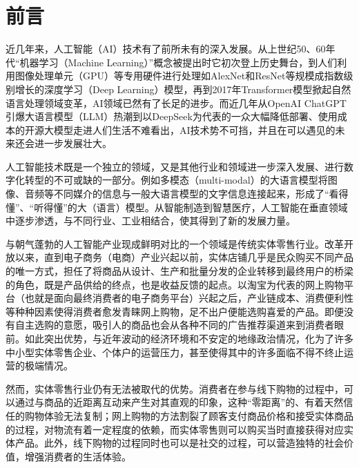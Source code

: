 \section{前\hspace{1em}言}

近几年来，人工智能（AI）技术有了前所未有的深入发展。从上世纪50、60年代“机器学习（Machine Learning）”\cite{samuel1959machine_learning}概念被提出时它初次登上历史舞台，到人们利用图像处理单元（GPU）等专用硬件进行处理\cite{raina2009deep_unsupervised_learning}如AlexNet\cite{krizhevsky2017alexnet}和ResNet\cite{he2016resnet}等规模成指数级别增长的深度学习（Deep Learning）模型，再到2017年Transformer模型\cite{vaswani2023attention_is_all_you_need}掀起自然语言处理领域变革，AI领域已然有了长足的进步。而近几年从OpenAI ChatGPT\cite{openai2022chatgpt}引爆大语言模型（LLM）热潮到以DeepSeek为代表的一众大幅降低部署、使用成本的开源大模型走进人们生活不难看出，AI技术势不可挡，并且在可以遇见的未来还会进一步发展壮大。

人工智能技术既是一个独立的领域，又是其他行业和领域进一步深入发展\cite{su2025ai_plus_concrete_economics}、进行数字化转型\cite{xie2025ai_plus_digitization}的不可或缺的一部分。例如多模态（multi-modal）的大语言模型将图像、音频等不同媒介的信息与一般大语言模型的文字信息连接起来，形成了“看得懂”、“听得懂”的大（语言）模型\cite{radford2022multimodal_speech}。从智能制造到智慧医疗，人工智能在垂直领域中逐步渗透，与不同行业、工业相结合，使其得到了新的发展力量。

与朝气蓬勃的人工智能产业现成鲜明对比的一个领域是传统实体零售行业。改革开放以来，直到电子商务（电商）产业兴起以前，实体店铺几乎是民众购买不同产品的唯一方式，担任了将商品从设计、生产和批量分发的企业转移到最终用户的桥梁的角色，既是产品供给的终点，也是收益反馈的起点。以淘宝为代表的网上购物平台（也就是面向最终消费者的电子商务平台）兴起之后，产业链成本、消费便利性等种种因素使得消费者愈发青睐网上购物\cite{wu2001online-consumer-analysis}，足不出户便能选购喜爱的产品\cite{cha2006ecom-satisfaction-factor}。即便没有自主选购的意愿，吸引人的商品也会从各种不同的广告推荐渠道来到消费者眼前。如此突出优势\cite{li2024ecom-retail-impact}，与近年波动的经济环境和不安定的地缘政治情况，化为了许多中小型实体零售企业、个体户的运营压力，甚至使得其中的许多面临不得不终止运营的极端情况。

然而，实体零售行业仍有无法被取代的优势\cite{amazon-retail}。消费者在参与线下购物的过程中，可以通过与商品的近距离互动来产生对其直观的印象，这种“零距离”的、有着天然信任的购物体验无法复制；网上购物的方法割裂了顾客支付商品价格和接受实体商品的过程，对物流有着一定程度的依赖，而实体零售则可以购买当时直接获得对应实体产品。此外，线下购物的过程同时也可以是社交的过程，可以营造独特的社会价值\cite{hao2025sustainable-retail}，增强消费者的生活体验\cite{zhong2024retail-food}。

